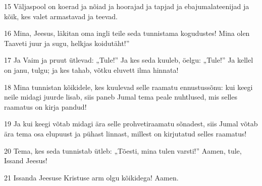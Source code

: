 \par 15 Väljaspool on koerad ja nõiad ja hoorajad ja tapjad ja ebajumalateenijad ja kõik, kes valet armastavad ja teevad.
\par 16 Mina, Jeesus, läkitan oma ingli teile seda tunnistama kogudustes! Mina olen Taaveti juur ja sugu, helkjas koidutäht!”
\par 17 Ja Vaim ja pruut ütlevad: „Tule!” Ja kes seda kuuleb, öelgu: „Tule!” Ja kellel on janu, tulgu; ja kes tahab, võtku eluvett ilma hinnata!
\par 18 Mina tunnistan kõikidele, kes kuulevad selle raamatu ennustussõnu: kui keegi neile midagi juurde lisab, siis paneb Jumal tema peale nuhtlused, mis selles raamatus on kirja pandud!
\par 19 Ja kui keegi võtab midagi ära selle prohvetiraamatu sõnadest, siis Jumal võtab ära tema osa elupuust ja pühast linnast, millest on kirjutatud selles raamatus!
\par 20 Tema, kes seda tunnistab ütleb: „Tõesti, mina tulen varsti!” Aamen, tule, Issand Jeesus!
\par 21 Issanda Jeesuse Kristuse arm olgu kõikidega! Aamen.






